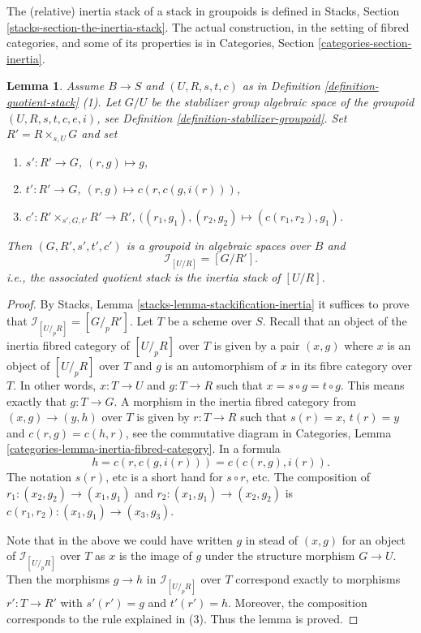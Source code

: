 \documentclass{stacks-project}
\theoremstyle{plain}
\newtheorem{lemma}[subsection]{Lemma}
\theoremstyle{definition}
\theoremstyle{remark}
\numberwithin{equation}{subsection}
\begin{document}
\noindent
The (relative) inertia stack of a stack in groupoids is defined in
Stacks, Section \ref{stacks-section-the-inertia-stack}.
The actual construction, in the setting of fibred categories, and some
of its properties is in
Categories, Section \ref{categories-section-inertia}.

\begin{lemma}
\label{lemma-presentation-inertia}
Assume $B \to S$ and $(U, R, s, t, c)$ as in
Definition \ref{definition-quotient-stack} (1).
Let $G/U$ be the stabilizer group algebraic space of the groupoid
$(U, R, s, t, c, e, i)$, see
Definition \ref{definition-stabilizer-groupoid}.
Set $R' = R \times_{s, U} G$ and set
\begin{enumerate}
\item $s' : R' \to G$, $(r, g) \mapsto g$,
\item $t' : R' \to G$, $(r, g) \mapsto c(r, c(g, i(r)))$,
\item $c' : R' \times_{s', G, t'} R' \to R'$,
$((r_1, g_1), (r_2, g_2) \mapsto (c(r_1, r_2), g_1)$.
\end{enumerate}
Then $(G, R', s', t', c')$ is a groupoid in algebraic spaces over $B$
and
$$
\mathcal{I}_{[U/R]} = [G/ R'].
$$
i.e., the associated quotient stack is the inertia stack of $[U/R]$.
\end{lemma}

\begin{proof}
By
Stacks, Lemma \ref{stacks-lemma-stackification-inertia}
it suffices to prove that $\mathcal{I}_{[U/_{\!p}R]} = [G/_{\!p} R']$.
Let $T$ be a scheme over $S$. Recall that an object of the inertia fibred
category of $[U/_{\!p}R]$ over $T$ is given by a pair
$(x, g)$ where $x$ is an object of $[U/_{\!\!p}R]$ over $T$
and $g$ is an automorphism of $x$ in its fibre category over $T$.
In other words, $x : T \to U$ and $g : T \to R$ such that
$x = s \circ g = t \circ g$. This means exactly that
$g : T \to G$. A morphism in the inertia fibred category
from $(x, g) \to (y, h)$ over $T$ is given by
$r : T \to R$ such that $s(r) = x$, $t(r) = y$
and $c(r, g) = c(h, r)$, see the commutative diagram in
Categories, Lemma \ref{categories-lemma-inertia-fibred-category}.
In a formula
$$
h = c(r, c(g, i(r))) = c(c(r, g), i(r)).
$$
The notation $s(r)$, etc is a short hand for $s \circ r$, etc.
The composition of $r_1 : (x_2, g_2) \to (x_1, g_1)$
and $r_2 : (x_1, g_1) \to (x_2, g_2)$ is
$c(r_1, r_2) : (x_1, g_1) \to (x_3, g_3)$.

\medskip\noindent
Note that in the above we could have written $g$ in stead of $(x, g)$
for an object of $\mathcal{I}_{[U/_{\!p}R]}$ over $T$ as $x$ is the
image of $g$ under the structure morphism $G \to U$. Then the morphisms
$g \to h$ in $\mathcal{I}_{[U/_{\!p}R]}$ over $T$ correspond exactly
to morphisms $r' : T \to R'$ with $s'(r') = g$ and $t'(r') = h$.
Moreover, the composition corresponds to the rule explained in (3).
Thus the lemma is proved.
\end{proof}
\end{document}
